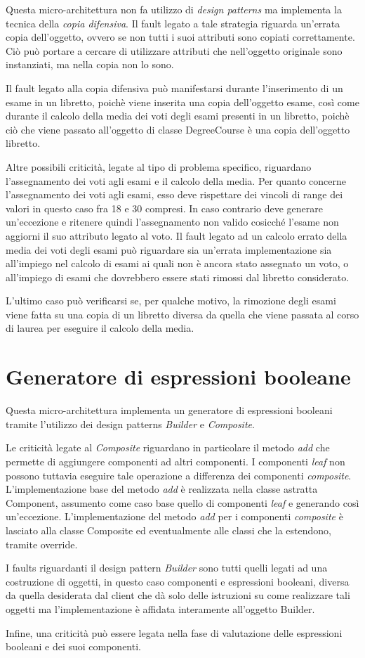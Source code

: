 Questa micro-architettura non fa utilizzo di \emph{design patterns} ma implementa la tecnica della \emph{copia difensiva}. Il fault legato a tale strategia riguarda un'errata copia dell'oggetto, ovvero se non tutti i suoi attributi sono copiati correttamente. Ciò può portare a cercare di utilizzare attributi che nell'oggetto originale sono instanziati, ma nella copia non lo sono.

Il fault legato alla copia difensiva può manifestarsi durante l'inserimento di un esame in un libretto, poichè viene inserita una copia dell'oggetto esame, così come durante il calcolo della media dei voti degli esami presenti in un libretto, poichè ciò che viene passato all'oggetto di classe DegreeCourse è una copia dell'oggetto libretto.

Altre possibili criticità, legate al tipo di problema specifico, riguardano l'assegnamento dei voti agli esami e il calcolo della media.
Per quanto concerne l'assegnamento dei voti agli esami, esso deve rispettare dei vincoli di range dei valori in questo caso fra 18 e 30 compresi. In caso contrario deve generare un'eccezione e ritenere quindi l'assegnamento non valido cosicché l'esame non aggiorni il suo attributo legato al voto.
Il fault legato ad un calcolo errato della media dei voti degli esami può riguardare sia un'errata implementazione sia all'impiego nel calcolo di esami ai quali non è ancora stato assegnato un voto, o all'impiego di esami che dovrebbero essere stati rimossi dal libretto considerato.

L'ultimo caso può verificarsi se, per qualche motivo, la rimozione degli esami viene fatta su una copia di un libretto diversa da quella che viene passata al corso di laurea per eseguire il calcolo della media.


\section{Generatore di espressioni booleane}

Questa micro-architettura implementa un generatore di espressioni booleani tramite l'utilizzo dei design patterns \emph{Builder} e \emph{Composite}.

Le criticità legate al \emph{Composite} riguardano in particolare il metodo \textit{add} che permette di aggiungere componenti ad altri componenti. I componenti \emph{leaf} non possono tuttavia eseguire tale operazione a differenza dei componenti \emph{composite}. L'implementazione base del metodo \emph{add} è realizzata nella classe astratta Component, assumento come caso base quello di componenti \emph{leaf} e generando così un'eccezione. L'implementazione del metodo \emph{add} per i componenti \emph{composite} è lasciato alla classe Composite ed eventualmente alle classi che la estendono, tramite override.

I faults riguardanti il design pattern \emph{Builder} sono tutti quelli legati ad una costruzione di oggetti, in questo caso componenti e espressioni booleani, diversa da quella desiderata dal client che dà solo delle istruzioni su come realizzare tali oggetti ma l'implementazione è affidata interamente all'oggetto Builder.

Infine, una criticità può essere legata nella fase di valutazione delle espressioni booleani e dei suoi componenti.